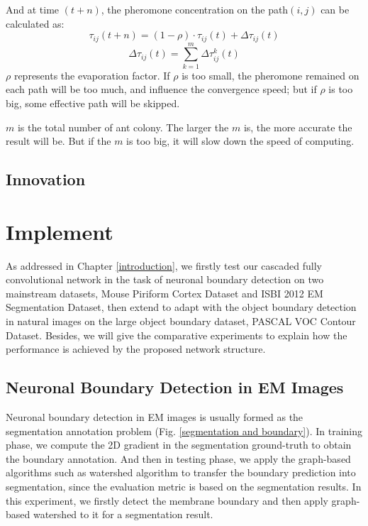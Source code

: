 \documentclass[senior]{IPSstyle}
\begin{document}
\begin{enumerate}
    And at time \((t+n)\), the pheromone concentration on the path\((i,j)\) can be calculated as:
    \begin{equation}
        \tau _{ij}(t+n)=(1-\rho)\cdot \tau _{ij}(t)+\Delta\tau _{ij}(t)
    \end{equation}
    \begin{equation}
        \Delta\tau _{ij}(t) = \sum_{k=1}^m \Delta\tau _{ij}^k(t)
    \end{equation}
    \(\rho\) represents the evaporation factor. If \(\rho\) is too small, the pheromone remained on each path will be too much, and influence the convergence speed; but if \(\rho\) is too big, some effective path will be skipped. 
    
    \(m\) is the total number of ant colony. The larger the \(m\) is, the  more accurate the result will be. But if the \(m\) is too big, it will slow down the speed of computing.
\end{enumerate}

 


\section{Innovation} \label{innovation}





\chapter{Implement} \label{implement}
As addressed in Chapter \ref{introduction}, we firstly test our cascaded fully convolutional network in the task of neuronal boundary detection on two mainstream datasets, Mouse Piriform Cortex Dataset\cite{Lee2015} and ISBI 2012 EM Segmentation Dataset\cite{Ronneberger2015}, then extend to adapt with the object boundary detection in natural images on the large object boundary dataset, PASCAL VOC Contour Dataset\cite{Yang2016}. Besides, we will give the comparative experiments to explain how the performance is achieved by the proposed network structure.

\section{Neuronal Boundary Detection in EM Images}

Neuronal boundary detection in EM images is usually formed as the segmentation annotation problem (Fig. \ref{segmentation and boundary}). In training phase, we compute the 2D gradient in the segmentation ground-truth to obtain the boundary annotation. And then in testing phase, we apply the graph-based algorithms such as watershed algorithm to transfer the boundary prediction into segmentation, since the evaluation metric is based on the segmentation results. In this experiment, we firstly detect the membrane boundary and then apply graph-based watershed\cite{Zlateski2015} to it for a segmentation result.
\end{document}
